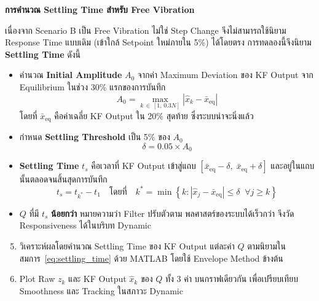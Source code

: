 \textbf{การคำนวณ Settling Time สำหรับ Free Vibration}
 
เนื่องจาก Scenario B เป็น Free Vibration ไม่ใช่ Step Change
จึงไม่สามารถใช้นิยาม Response Time แบบเดิม (เข้าใกล้ Setpoint ใหม่ภายใน 5\%)
ได้โดยตรง การทดลองนี้จึงนิยาม \textbf{Settling Time} ดังนี้
 
\begin{itemize}
    \item คำนวณ \textbf{Initial Amplitude} $A_0$ จากค่า Maximum Deviation
          ของ KF Output จาก Equilibrium ในช่วง 30\% แรกของการบันทึก
          \begin{equation}
              A_0 = \max_{k \,\in\, [1,\, 0.3N]} \left|\hat{x}_k - \bar{x}_{\mathrm{eq}}\right|
              \label{eq:init_amp}
          \end{equation}
          โดยที่ $\bar{x}_{\mathrm{eq}}$ คือค่าเฉลี่ย KF Output ใน 20\% สุดท้าย
          ซึ่งระบบน่าจะนิ่งแล้ว
    \item กำหนด \textbf{Settling Threshold} เป็น 5\% ของ $A_0$
          \begin{equation}
              \delta = 0.05 \times A_0
              \label{eq:settle_threshold}
          \end{equation}
    \item \textbf{Settling Time} $t_s$ คือเวลาที่ KF Output เข้าสู่แถบ
          $[\bar{x}_{\mathrm{eq}} - \delta,\; \bar{x}_{\mathrm{eq}} + \delta]$
          และอยู่ในแถบนั้นตลอดจนสิ้นสุดการบันทึก
          \begin{equation}
              t_s = t_{k^*} - t_1
              \quad \text{โดยที่} \quad
              k^* = \min\left\{k : \left|\hat{x}_j - \bar{x}_{\mathrm{eq}}\right| \leq \delta
              \;\;\forall j \geq k \right\}
              \label{eq:settling_time}
          \end{equation}
    \item $Q$ ที่มี $t_s$ \textbf{น้อยกว่า} หมายความว่า Filter ปรับตัวตาม
          พลศาสตร์ของระบบได้เร็วกว่า จึงวัด Responsiveness ได้ในบริบท Dynamic
\end{itemize}
 
\begin{enumerate}
    \setcounter{enumi}{4}
    \item วิเคราะห์ผลโดยคำนวณ Settling Time ของ KF Output
          แต่ละค่า $Q$ ตามนิยามในสมการ~\eqref{eq:settling_time}
          ด้วย MATLAB โดยใช้ Envelope Method ข้างต้น
    \item Plot Raw $z_k$ และ KF Output $\hat{x}_k$ ของ $Q$ ทั้ง 3 ค่า
          บนกราฟเดียวกัน เพื่อเปรียบเทียบ Smoothness และ Tracking
          ในสภาวะ Dynamic
\end{enumerate}

